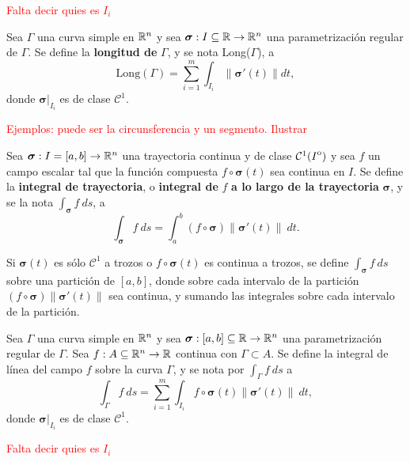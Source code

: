 
\textcolor{red}{Falta decir quies es $I_i$}



\begin{definition}
    Sea $\Gamma$ una curva simple en $\mathbb{R}^n$ y sea $\boldsymbol{\sigma}:I\subseteq\mathbb{R}\to\mathbb{R}^n$ una parametrizaci\'on regular de $\Gamma$. Se define la \textbf{longitud de} $\Gamma$, y se nota  Long($\Gamma$), a 
    \[
        \text{Long}(\Gamma)=\sum_{i=1}^{m}\int_{I_i}\|\boldsymbol{\sigma}'(t)\|dt,    
    \]
    donde $\boldsymbol{\sigma}\lvert_{I_i}$ es de clase $\mathcal{C}^1$.
\end{definition}


\textcolor{red}{Ejemplos: puede ser la circunsferencia y un segmento.  Ilustrar}

\begin{definition}
    Sea $\boldsymbol{\sigma}:I=[a,b]\to\mathbb{R}^n$ una trayectoria continua y de clase $\mathcal{C}^1({\kern0ptI}^{\mathrm{o}})$ y sea $f$ un campo escalar tal que la funci\'on compuesta $f\circ\boldsymbol{\sigma}(t)$ sea continua en $I$. Se define la \textbf{integral de trayectoria}, o \textbf{integral de} $f$ \textbf{a lo largo de la trayectoria} $\boldsymbol{\sigma}$, y se la nota $\int_{\boldsymbol{\sigma}}f\:ds$, a
    \[
        \int_{\boldsymbol{\sigma}}f\:ds=\int_a^b (f\circ\boldsymbol{\sigma})\|\boldsymbol{\sigma}'(t)\|\:dt.
    \]
\end{definition}

Si $\boldsymbol{\sigma}(t)$ es s\'olo $\mathcal{C}^1$ a trozos o $f\circ\boldsymbol{\sigma}(t)$ es continua a trozos, se define $\int_{\boldsymbol{\sigma}}f\:ds$ sobre una partici\'on de $[a,b]$, donde sobre cada intervalo de la partici\'on $(f\circ\boldsymbol{\sigma})\|\boldsymbol{\sigma}'(t)\|$ sea continua, y sumando las integrales sobre cada intervalo de la partici\'on. 

\begin{definition}
    Sea $\Gamma$ una curva simple en $\mathbb{R}^n$ y sea $\boldsymbol{\sigma}:[a,b] \subseteq\mathbb{R}\to\mathbb{R}^n$ una parametrizaci\'on regular de $\Gamma$.  Sea $f:A\subseteq\mathbb{R}^n\to\mathbb{R}$ continua con $\Gamma \subset A$.  Se define la integral de l\'inea del campo $f$ sobre la curva $\Gamma$, y se nota por $\int_{\Gamma}f\:ds$ a
    \[
        \int_{\Gamma}f\:ds=\sum_{i=1}^{m}\int_{I_i}f\circ\boldsymbol{\sigma}(t)\|\boldsymbol{\sigma}'(t)\|\:dt,  
    \]
    donde $\boldsymbol{\sigma}\lvert_{I_i}$ es de clase $\mathcal{C}^1$.
\end{definition}

\textcolor{red}{Falta decir quies es $I_i$}

